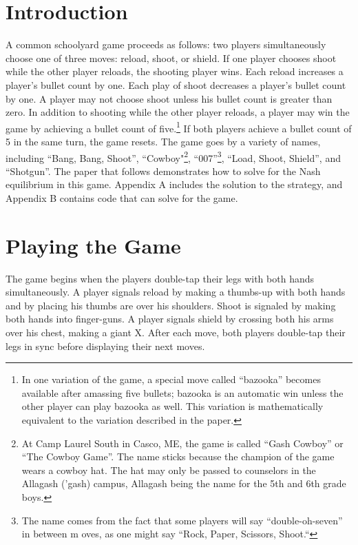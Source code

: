 \documentclass[11pt]{article}
\begin{document}
\begin{multicols}{2}

\section{Introduction}

A common schoolyard game proceeds as follows: two players simultaneously choose one of three moves: reload, shoot, or shield. If one player chooses shoot while the other player reloads, the shooting player wins. Each reload increases a player's bullet count by one. Each play of shoot decreases a player's bullet count by one. A player may not choose shoot unless his bullet count is greater than zero. In addition to shooting while the other player reloads, a player may win the game by achieving a bullet count of five.\footnote{In one variation of the game, a special move called ``bazooka'' becomes available after amassing five bullets; bazooka is an automatic win unless the other player can play bazooka as well. This variation is mathematically equivalent to the variation described in the paper.} If both players achieve a bullet count of 5 in the same turn, the game resets. The game goes by a variety of names, including ``Bang, Bang, Shoot'', ``Cowboy"\footnote{At Camp Laurel South in Casco, ME, the game is called ``Gash Cowboy'' or ``The Cowboy Game''. The name sticks because the  champion of the game wears a cowboy hat. The hat may only be passed to counselors in the Allagash ('gash) campus, Allagash being the name for the 5th and 6th grade boys.}, ``007''\footnote{The name comes from the fact that some players will say ``double-oh-seven'' in between m oves, as one might say ``Rock, Paper, Scissors, Shoot.``}, ``Load, Shoot, Shield'', and ``Shotgun''. The paper that follows demonstrates how to solve for the Nash equilibrium in this game. Appendix A includes the solution to the strategy, and Appendix B contains code that can solve for the game.

\section{Playing the Game}

The game begins when the players double-tap their legs with both hands simultaneously. A player signals reload by making a thumbs-up with both hands and by placing his thumbs are over his shoulders. Shoot is signaled by making both hands into finger-guns. A player signals shield by crossing both his arms over his chest, making a giant X. After each move, both players double-tap their legs in sync before displaying their next moves.
\\


\end{multicols}
\end{document}
